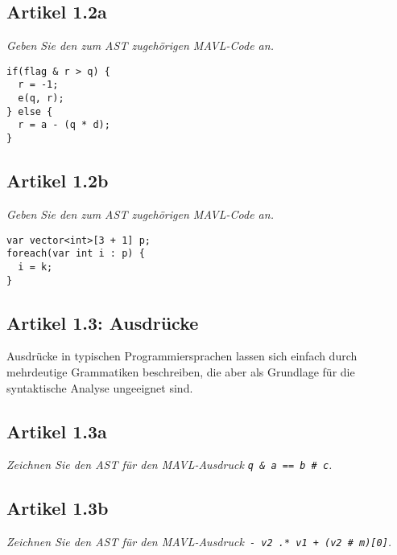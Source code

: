 \documentclass[
  ngerman,
  DIV=14
]{scrartcl}
\begin{document}
\subsection*{Artikel 1.2a}
\emph{Geben Sie den zum AST zugehörigen MAVL-Code an.}  

\bigskip\noindent
\begin{lstlisting}
if(flag & r > q) {
  r = -1;
  e(q, r);
} else {
  r = a - (q * d);
}
\end{lstlisting}

\subsection*{Artikel 1.2b}
\emph{Geben Sie den zum AST zugehörigen MAVL-Code an.}

\bigskip\noindent
\begin{lstlisting}
var vector<int>[3 + 1] p;
foreach(var int i : p) {
  i = k;
}  
\end{lstlisting}


\subsection*{Artikel 1.3: Ausdrücke}
Ausdrücke in typischen Programmiersprachen lassen sich einfach durch mehrdeutige Grammatiken beschreiben, die aber als Grundlage für die syntaktische Analyse ungeeignet sind.

\subsection*{Artikel 1.3a}
\emph{Zeichnen Sie den AST für den MAVL-Ausdruck \texttt{q \& a == b \# c}.}


\bigskip\noindent
{\centering{}\par}


\subsection*{Artikel 1.3b}
\emph{Zeichnen Sie den AST für den MAVL-Ausdruck\texttt{ - v2 .* v1 + (v2 \# m)[0]}.}


\bigskip\noindent
{\centering{}\par}
\end{document}
